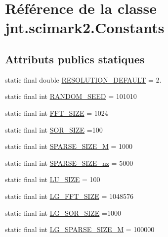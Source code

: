 \hypertarget{classjnt_1_1scimark2_1_1Constants}{\section{Référence de la classe jnt.\-scimark2.\-Constants}
\label{classjnt_1_1scimark2_1_1Constants}
}
\subsection*{Attributs publics statiques}
\begin{DoxyCompactItemize}
\item 
static final double \hyperlink{classjnt_1_1scimark2_1_1Constants_a1af772837e171bb081aad6a5c9e8b03d}{R\-E\-S\-O\-L\-U\-T\-I\-O\-N\-\_\-\-D\-E\-F\-A\-U\-L\-T} = 2.
\item 
static final int \hyperlink{classjnt_1_1scimark2_1_1Constants_a4968d6acfa0752320ae00c6866246a5e}{R\-A\-N\-D\-O\-M\-\_\-\-S\-E\-E\-D} = 101010
\item 
static final int \hyperlink{classjnt_1_1scimark2_1_1Constants_a8278c8d34f5ef97e73561ebcc6f50904}{F\-F\-T\-\_\-\-S\-I\-Z\-E} = 1024
\item 
static final int \hyperlink{classjnt_1_1scimark2_1_1Constants_ad9ed82d3119e5fd04c46eba15cf74df9}{S\-O\-R\-\_\-\-S\-I\-Z\-E} =100
\item 
static final int \hyperlink{classjnt_1_1scimark2_1_1Constants_a2be4be19d81f121b50c2a45edfb7b84e}{S\-P\-A\-R\-S\-E\-\_\-\-S\-I\-Z\-E\-\_\-\-M} = 1000
\item 
static final int \hyperlink{classjnt_1_1scimark2_1_1Constants_a23d7ed0819eb48a3b902019080c29ec7}{S\-P\-A\-R\-S\-E\-\_\-\-S\-I\-Z\-E\-\_\-nz} = 5000
\item 
static final int \hyperlink{classjnt_1_1scimark2_1_1Constants_ae59998883f1ca275fae94d14c166d142}{L\-U\-\_\-\-S\-I\-Z\-E} = 100
\item 
static final int \hyperlink{classjnt_1_1scimark2_1_1Constants_adf99121540e6850d66f552fad1defeac}{L\-G\-\_\-\-F\-F\-T\-\_\-\-S\-I\-Z\-E} = 1048576
\item 
static final int \hyperlink{classjnt_1_1scimark2_1_1Constants_a77811d1c9d50500f998f5633a951723e}{L\-G\-\_\-\-S\-O\-R\-\_\-\-S\-I\-Z\-E} =1000
\item 
static final int \hyperlink{classjnt_1_1scimark2_1_1Constants_ae25386f7be7e0afb04f86efe6ac1b80e}{L\-G\-\_\-\-S\-P\-A\-R\-S\-E\-\_\-\-S\-I\-Z\-E\-\_\-\-M} = 100000
\item 

\end{DoxyCompactItemize}
